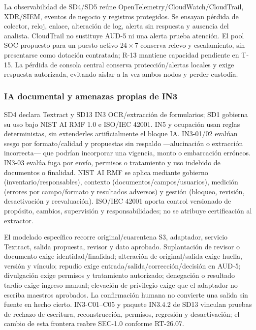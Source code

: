 La observabilidad de SD4/SD5 reúne OpenTelemetry/CloudWatch/CloudTrail, XDR/SIEM, eventos de negocio y registros protegidos. Se ensayan pérdida de colector, reloj, enlace, alteración de log, alerta sin respuesta y ausencia del analista. CloudTrail no sustituye AUD-5 ni una alerta prueba atención. El pool SOC propuesto para un puesto activo 24\,$\times$\,7 conserva relevo y escalamiento, sin presentarse como dotación contratada; R-13 mantiene capacidad pendiente en T-15. La pérdida de consola central conserva protección/alertas locales y exige respuesta autorizada, evitando aislar a la vez ambos nodos y perder custodia.

\subsubsection{IA documental y amenazas propias de IN3}\label{sec:sd8-ia-riesgos}
SD4 declara Textract y SD13 IN3 OCR/extracción de formularios; SD1 gobierna su uso bajo NIST AI RMF 1.0 e ISO/IEC 42001. IN5 y ocupación usan reglas deterministas, sin extenderles artificialmente el bloque IA. IN3-01/02 evalúan sesgo por formato/calidad y propuestas sin respaldo —alucinación o extracción incorrecta— que podrían incorporar una vigencia, monto o embarcación erróneos. IN3-03 evalúa fuga por envío, permisos o tratamiento y uso indebido de documentos o finalidad. NIST AI RMF se aplica mediante gobierno (inventario/responsables), contexto (documentos/campos/usuarios), medición (errores por campo/formato y resultados adversos) y gestión (bloqueo, revisión, desactivación y reevaluación). ISO/IEC 42001 aporta control versionado de propósito, cambios, supervisión y responsabilidades; no se atribuye certificación al extractor.

El modelado específico recorre original/cuarentena S3, adaptador, servicio Textract, salida propuesta, revisor y dato aprobado. Suplantación de revisor o documento exige identidad/finalidad; alteración de original/salida exige huella, versión y vínculo; repudio exige entrada/salida/corrección/decisión en AUD-5; divulgación exige permisos y tratamiento autorizado; denegación o resultado tardío exige ingreso manual; elevación de privilegio exige que el adaptador no escriba maestros aprobados. La confirmación humana no convierte una salida sin fuente en hecho cierto. IN3-C01--C05 y paquete IN3.4.2 de SD13 vinculan pruebas de rechazo de escritura, reconstrucción, permisos, regresión y desactivación; el cambio de esta frontera reabre SEC-1.0 conforme RT-26.07.


